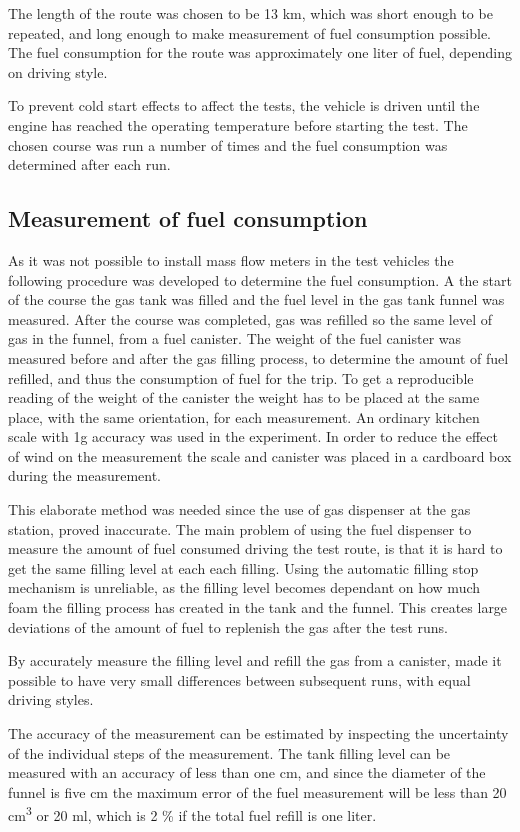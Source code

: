 The length of the route was chosen to be 13 km, which was short enough to be repeated, and long enough to make measurement of fuel consumption possible. The fuel consumption for the route was approximately one liter of fuel, depending on driving style.

To prevent cold start effects to affect the tests, the vehicle is driven until the engine has reached the operating temperature before starting the test. The chosen course was run a number of times and the fuel consumption was determined after each run.

\subsection{Measurement of fuel consumption}

As it was not possible to install mass flow meters in the test vehicles the following procedure was developed to determine the fuel consumption. A the start of the course the gas tank was filled and  the fuel level in the gas tank funnel was measured. After the course was completed, gas was refilled so the same level of gas in the funnel, from a fuel canister. The weight of the fuel canister was measured before and after the gas filling process, to determine the amount of fuel refilled, and thus the consumption of fuel for the trip. To get a reproducible reading of the weight of the canister the weight has to be placed at the same place, with the same orientation, for each measurement. An ordinary kitchen scale with 1g accuracy was used in the experiment. In order to reduce the effect of wind on the measurement the scale and canister was placed in a cardboard box during the measurement.

This elaborate method was needed since the use of gas dispenser at the gas station, proved inaccurate. The main problem of using the fuel dispenser to measure the amount of fuel consumed driving the test route, is that it is hard to get the same filling level at each each filling. Using the automatic filling stop mechanism is unreliable, as the filling level becomes dependant on how much foam the filling process has created in the tank and the funnel. This creates large deviations of the amount of fuel to replenish the gas after the test runs. 

By accurately measure the filling level and refill the gas from a canister, made it possible to have very small differences between subsequent runs, with equal driving styles. 

The accuracy of the measurement can be estimated by inspecting the uncertainty of the individual steps of the measurement. The tank filling level can be measured with an accuracy of less than one cm, and since the diameter of the funnel is five cm the maximum error of the fuel measurement will be less than 20 cm\textsuperscript{3} or 20 ml, which is 2 \% if the total fuel refill is one liter.
